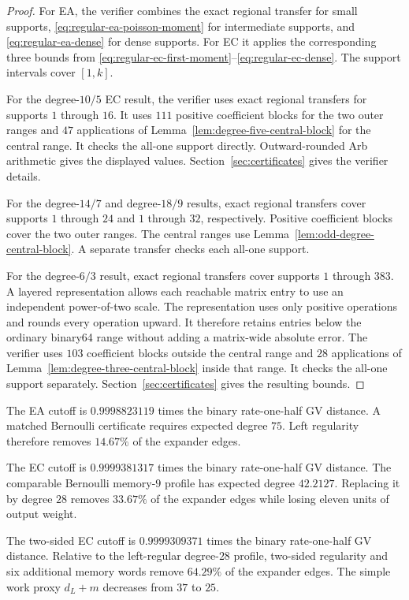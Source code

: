 \begin{proof}
For EA, the verifier combines the exact regional transfer for small supports,
\eqref{eq:regular-ea-poisson-moment} for intermediate supports, and
\eqref{eq:regular-ea-dense} for dense supports.  For EC it applies the
corresponding three bounds from
\eqref{eq:regular-ec-first-moment}--\eqref{eq:regular-ec-dense}.  The support
intervals cover $[1,k]$.

For the degree-$10/5$ EC result, the verifier uses exact regional transfers for
supports $1$ through $16$.  It uses $111$ positive coefficient blocks for
the two outer ranges and $47$ applications of
Lemma~\ref{lem:degree-five-central-block} for the central range.  It checks
the all-one support directly.  Outward-rounded Arb arithmetic gives the
displayed values.  Section~\ref{sec:certificates} gives the verifier details.

For the degree-$14/7$ and degree-$18/9$ results, exact regional transfers
cover supports $1$ through $24$ and $1$ through $32$, respectively.  Positive
coefficient blocks cover the two outer ranges.  The central ranges use
Lemma~\ref{lem:odd-degree-central-block}.  A separate transfer checks each
all-one support.

For the degree-$6/3$ result, exact regional transfers cover supports $1$
through $383$.  A layered representation allows each reachable matrix entry
to use an independent power-of-two scale.  The representation uses only positive
operations and rounds every operation upward.  It therefore retains entries
below the ordinary binary64 range without adding a matrix-wide absolute
error.  The verifier uses $103$ coefficient blocks outside the central range
and $28$ applications of Lemma~\ref{lem:degree-three-central-block} inside
that range.  It checks the all-one support separately.
Section~\ref{sec:certificates} gives the resulting bounds.
\end{proof}

The EA cutoff is $0.9998823119$ times the binary rate-one-half GV distance.
A matched Bernoulli certificate requires expected degree $75$.  Left
regularity therefore removes $14.67\%$ of the expander edges.

The EC cutoff is $0.9999381317$ times the binary rate-one-half GV distance.
The comparable Bernoulli memory-$9$ profile has expected degree $42.2127$.
Replacing it by degree $28$ removes $33.67\%$ of the expander edges while
losing eleven units of output weight.

The two-sided EC cutoff is $0.9999309371$ times the binary rate-one-half GV
distance.  Relative to the left-regular degree-$28$ profile, two-sided
regularity and six additional memory words remove $64.29\%$ of the expander
edges.  The simple work proxy $d_L+m$ decreases from $37$ to $25$.

